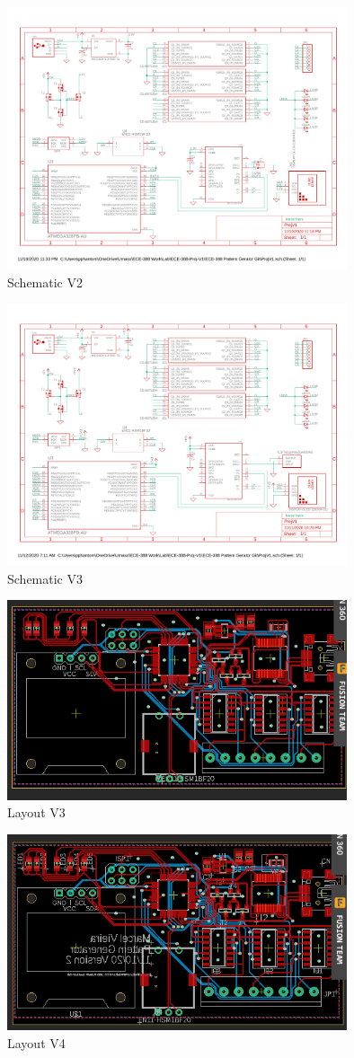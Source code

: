 \documentclass[12pt]{article}
\begin{document}
\begin{figure}[htp]
    \centering
    \includegraphics[width=10cm]{ProjV2.pdf}
    \caption{Schematic V2}
\end{figure}

\begin{figure}[htp]
    \centering
    \includegraphics[width=10cm]{ProjV3.pdf}
    \caption{Schematic V3}
\end{figure}

\begin{figure}[htp]
    \centering
    \includegraphics[width=10cm]{LayoutV3.png}
    \caption{Layout V3}
\end{figure}

\begin{figure}[htp]
    \centering
    \includegraphics[width=10cm]{LayoutV4.png}
    \caption{Layout V4}
\end{figure}
\end{document}
